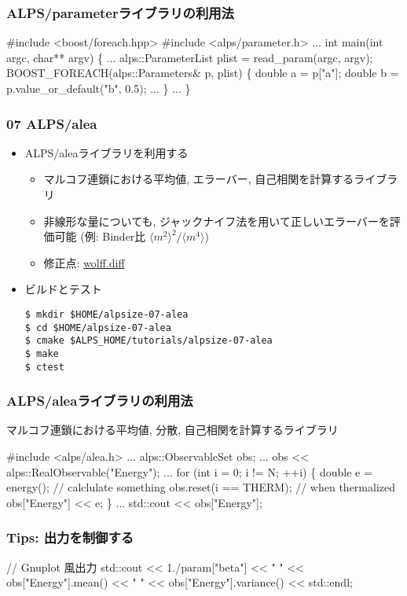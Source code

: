 \begin{frame}[fragile,shrink=5] \frametitle{ALPS/parameterライブラリの利用法}
\begin{semiverbatim}
#include <boost/foreach.hpp>
#include <alps/parameter.h>
...
int main(int argc, char** argv) \{
...
  alps::ParameterList plist = read_param(argc, argv);
  BOOST_FOREACH(alps::Parameters& p, plist) \{
    \alert<1>{double a = p["a"];}
    \alert<2>{double b = p.value_or_default("b", 0.5);}
...
  \}
...
\}
\end{semiverbatim}
\end{frame}

\begin{frame}[fragile]
  \frametitle{07 ALPS/alea}
  \begin{itemize}
    \item ALPS/aleaライブラリを利用する
      \begin{itemize}
        \item マルコフ連鎖における平均値, エラーバー, 自己相関を計算するライブラリ
        \item 非線形な量についても, ジャックナイフ法を用いて正しいエラーバーを評価可能 (例: Binder比 $\langle m^2 \rangle^2 / \langle m^4 \rangle$)
        \item 修正点: \href{https://github.com/cmsi/alps-tutorial/blob/develop/alpsize/07-wolff.diff}{wolff.diff}
      \end{itemize}
    \item ビルドとテスト
\begin{lstlisting}
$ mkdir $HOME/alpsize-07-alea
$ cd $HOME/alpsize-07-alea
$ cmake $ALPS_HOME/tutorials/alpsize-07-alea
$ make
$ ctest
\end{lstlisting}
  \end{itemize}
\end{frame}

\begin{frame}[fragile,shrink=10] \frametitle{ALPS/aleaライブラリの利用法}
  マルコフ連鎖における平均値, 分散, 自己相関を計算するライブラリ
\begin{semiverbatim}
#include <alps/alea.h>
...
alps::ObservableSet obs;
...
obs << alps::RealObservable("Energy");
...
for (int i = 0; i != N; ++i) \{
  double e = energy(); // calclulate something
  obs.reset(i == THERM); // when thermalized
  obs["Energy"] << e;
\}
...
std::cout << obs["Energy"];
\end{semiverbatim}
\end{frame}

\begin{frame}[fragile,shrink=10] \frametitle{Tips: 出力を制御する}
\begin{semiverbatim}
// Gnuplot 風出力
std::cout << 1./param["beta"] << " "
          << obs["Energy"].mean() << " "
          << obs["Energy"].variance() << std::endl;
\end{semiverbatim}
\end{frame}

